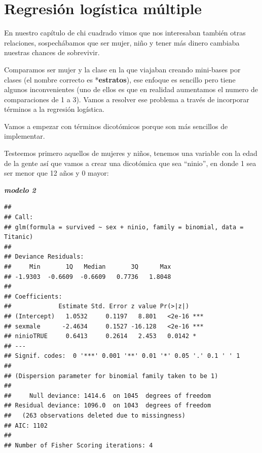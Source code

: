 \documentclass[
]{book}
\newenvironment{Shaded}{\begin{snugshade}}{\end{snugshade}}
\newcommand{\AttributeTok}[1]{\textcolor[rgb]{0.77,0.63,0.00}{#1}}
\newcommand{\DecValTok}[1]{\textcolor[rgb]{0.00,0.00,0.81}{#1}}
\newcommand{\FunctionTok}[1]{\textcolor[rgb]{0.00,0.00,0.00}{#1}}
\newcommand{\NormalTok}[1]{#1}
\newcommand{\OtherTok}[1]{\textcolor[rgb]{0.56,0.35,0.01}{#1}}
\newcommand{\SpecialCharTok}[1]{\textcolor[rgb]{0.00,0.00,0.00}{#1}}
\begin{document}
\hypertarget{regresiuxf3n-loguxedstica-muxfaltiple}{%
\section{Regresión logística múltiple}\label{regresiuxf3n-loguxedstica-muxfaltiple}}

En nuestro capítulo de chi cuadrado vimos que nos interesaban también otras relaciones, sospechábamos que ser mujer, niño y tener más dinero cambiaba nuestras chances de sobrevivir.

Comparamos ser mujer y la clase en la que viajaban creando mini-bases por clases (el nombre correcto es *\textbf{estratos}), ese enfoque es sencillo pero tiene algunos inconvenientes (uno de ellos es que en realidad aumentamos el numero de comparaciones de 1 a 3). Vamos a resolver ese problema a través de incorporar términos a la regresión logística.

Vamos a empezar con términos dicotómicos porque son más sencillos de implementar.

Testeemos primero aquellos de mujeres y niños, tenemos una variable con la edad de la gente así que vamos a crear una dicotómica que sea ``ninio'', en donde 1 sea ser menor que 12 años y 0 mayor:

\textbf{\emph{modelo 2}}

\begin{Shaded}
\end{Shaded}

\begin{verbatim}
## 
## Call:
## glm(formula = survived ~ sex + ninio, family = binomial, data = Titanic)
## 
## Deviance Residuals: 
##     Min       1Q   Median       3Q      Max  
## -1.9303  -0.6609  -0.6609   0.7736   1.8048  
## 
## Coefficients:
##             Estimate Std. Error z value Pr(>|z|)    
## (Intercept)   1.0532     0.1197   8.801   <2e-16 ***
## sexmale      -2.4634     0.1527 -16.128   <2e-16 ***
## ninioTRUE     0.6413     0.2614   2.453   0.0142 *  
## ---
## Signif. codes:  0 '***' 0.001 '**' 0.01 '*' 0.05 '.' 0.1 ' ' 1
## 
## (Dispersion parameter for binomial family taken to be 1)
## 
##     Null deviance: 1414.6  on 1045  degrees of freedom
## Residual deviance: 1096.0  on 1043  degrees of freedom
##   (263 observations deleted due to missingness)
## AIC: 1102
## 
## Number of Fisher Scoring iterations: 4
\end{verbatim}
\end{document}
